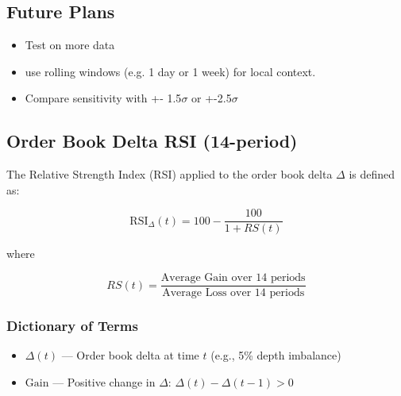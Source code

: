 \documentclass[12pt]{article}
\begin{document}
\subsection*{Future Plans}

\begin{itemize}
    \item Test on more data
    \item use rolling windows (e.g. 1 day or 1 week) for local context.
    \item Compare sensitivity with +- 1.5$\sigma$ or +-2.5$\sigma$
\end{itemize}

\newpage

\subsection*{Order Book Delta RSI (14-period)}

The Relative Strength Index (RSI) applied to the order book delta $\Delta$ is defined as:

\[
\text{RSI}_{\Delta}(t) = 100 - \frac{100}{1 + RS(t)}
\]

where

\[
RS(t) = \frac{\text{Average Gain over 14 periods}}{\text{Average Loss over 14 periods}}
\]


\subsubsection*{Dictionary of Terms}

\begin{itemize}
  \item $\Delta(t)$ — Order book delta at time $t$ (e.g., 5\% depth imbalance)
  \item $\text{Gain}$ — Positive change in $\Delta$: $\Delta(t) - \Delta(t-1) > 0$

\end{itemize}
\end{document}
